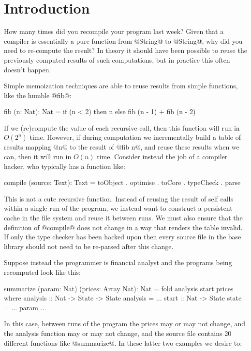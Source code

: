 \section{Introduction}
How many times did you recompile your program last week? Given that a compiler is essentially a pure function from @String@ to @String@, why did you need to re-compute the result? In theory it should have been possible to reuse the previously computed results of such computations, but in practice this often doesn't happen.

Simple memoization techniques are able to reuse results from simple functions, like the humble @fib@:
%
\begin{code}
  fib (n: Nat): Nat
   = if (n < 2) then n
                else fib (n - 1) + fib (n - 2)
\end{code}
%
If we (re)compute the value of each recursive call, then this function will run in $O(2^n)$ time. However, if during computation we incrementally build a table of results mapping @n@ to the result of @fib n@, and reuse these results when we can, then it will run in $O(n)$ time. Consider instead the job of a compiler hacker, who typically has a function like:
%
\begin{code}
 compile (source: Text): Text
  = toObject . optimise . toCore . typeCheck . parse
\end{code}
%
This is not a cute recursive function. Instead of reusing the result of self calls within a single run of the program, we instead want to construct a persistent cache in the file system and reuse it between runs. We must also ensure that the definition of @compile@ does not change in a way that renders the table invalid. If only the type checker has been hacked upon then every source file in the base library should not need to be re-parsed after this change.

\eject
Suppose instead the programmer is financial analyst and the programs being recomputed look like this:
%
\begin{code}
  summarize (param: Nat) (prices: Array Nat): Nat
   = fold analysis start prices
   where analysis :: Nat -> State -> State
         analysis = ...
         start    :: Nat -> State
         state    = ... param ...
\end{code}
%
In this case, between runs of the program the prices may or may not change, and the analysis function may or may not change, and the source file contains 20 different functions like @summarize@. In these latter two examples we desire to:

